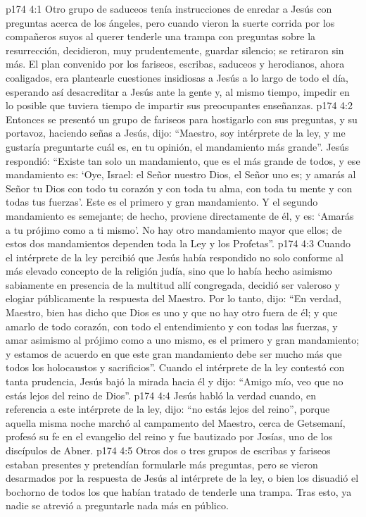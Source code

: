 \vs p174 4:1 Otro grupo de saduceos tenía instrucciones de enredar a Jesús con preguntas acerca de los ángeles, pero cuando vieron la suerte corrida por los compañeros suyos al querer tenderle una trampa con preguntas sobre la resurrección, decidieron, muy prudentemente, guardar silencio; se retiraron sin más. El plan convenido por los fariseos, escribas, saduceos y herodianos, ahora coaligados, era plantearle cuestiones insidiosas a Jesús a lo largo de todo el día, esperando así desacreditar a Jesús ante la gente y, al mismo tiempo, impedir en lo posible que tuviera tiempo de impartir sus preocupantes enseñanzas.
\vs p174 4:2 Entonces se presentó un grupo de fariseos para hostigarlo con sus preguntas, y su portavoz, haciendo señas a Jesús, dijo: “Maestro, soy intérprete de la ley, y me gustaría preguntarte cuál es, en tu opinión, el mandamiento más grande”. Jesús respondió: “Existe tan solo un mandamiento, que es el más grande de todos, y ese mandamiento es: ‘Oye, Israel: el Señor nuestro Dios, el Señor uno es; y amarás al Señor tu Dios con todo tu corazón y con toda tu alma, con toda tu mente y con todas tus fuerzas’. Este es el primero y gran mandamiento. Y el segundo mandamiento es semejante; de hecho, proviene directamente de él, y es: ‘Amarás a tu prójimo como a ti mismo’. No hay otro mandamiento mayor que ellos; de estos dos mandamientos dependen toda la Ley y los Profetas”.
\vs p174 4:3 Cuando el intérprete de la ley percibió que Jesús había respondido no solo conforme al más elevado concepto de la religión judía, sino que lo había hecho asimismo sabiamente en presencia de la multitud allí congregada, decidió ser valeroso y elogiar públicamente la respuesta del Maestro. Por lo tanto, dijo: “En verdad, Maestro, bien has dicho que Dios es uno y que no hay otro fuera de él; y que amarlo de todo corazón, con todo el entendimiento y con todas las fuerzas, y amar asimismo al prójimo como a uno mismo, es el primero y gran mandamiento; y estamos de acuerdo en que este gran mandamiento debe ser mucho más que todos los holocaustos y sacrificios”. Cuando el intérprete de la ley contestó con tanta prudencia, Jesús bajó la mirada hacia él y dijo: “Amigo mío, veo que no estás lejos del reino de Dios”.
\vs p174 4:4 \pc Jesús habló la verdad cuando, en referencia a este intérprete de la ley, dijo: “no estás lejos del reino”, porque aquella misma noche marchó al campamento del Maestro, cerca de Getsemaní, profesó su fe en el evangelio del reino y fue bautizado por Josías, uno de los discípulos de Abner.
\vs p174 4:5 \pc Otros dos o tres grupos de escribas y fariseos estaban presentes y pretendían formularle más preguntas, pero se vieron desarmados por la respuesta de Jesús al intérprete de la ley, o bien los disuadió el bochorno de todos los que habían tratado de tenderle una trampa. Tras esto, ya nadie se atrevió a preguntarle nada más en público.
